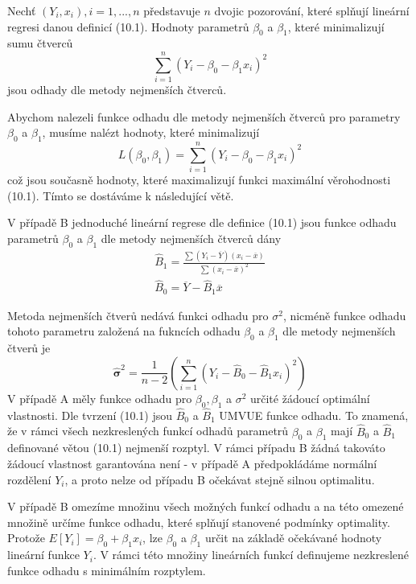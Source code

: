 \begin{definition}
Nechť $(Y_i, x_i), i = 1, ..., n$ představuje $n$ dvojic pozorování, které splňují lineární regresi danou definicí (10.1). Hodnoty parametrů $\beta_0$ a $\beta_1$, které minimalizují sumu čtverců
\begin{equation*}
\sum_{i = 1}^n (Y_i - \beta_0 - \beta_1 x_i)^2
\end{equation*}
jsou odhady dle metody nejmenších čtverců.
\end{definition}

Abychom nalezeli funkce odhadu dle metody nejmenších čtverců pro parametry $\beta_0$ a $\beta_1$, musíme nalézt hodnoty, které minimalizují
\begin{equation*}
L(\beta_0, \beta_1) = \sum_{i = 1}^n (Y_i - \beta_0 - \beta_1 x_i)^2
\end{equation*}
což jsou současně hodnoty, které maximalizují funkci maximální věrohodnosti (10.1). Tímto se dostáváme k následující větě.
\begin{theorem}
V případě B jednoduché lineární regrese dle definice (10.1) jsou funkce odhadu parametrů $\beta_0$ a $\beta_1$ dle metody nejmenších čtverců dány
\begin{gather*}
\hat{B}_1 = \frac{\sum (Y_i - \overline{Y})(x_i - \overline{x})}{\sum (x_i - \overline{x})^2}\\
\hat{B}_0 = \overline{Y} - \hat{B}_1 \overline{x}
\end{gather*}
\end{theorem}

Metoda nejmenších čtverů nedává funkci odhadu pro $\sigma^2$, nicméně funkce odhadu tohoto parametru založená na fukncích odhadu $\beta_0$ a $\beta_1$ dle metody nejmenších čtverů je
\begin{equation*}
\hat{\boldsymbol \sigma}^2 = \frac{1}{n - 2}\left(\sum_{i = 1}^n (Y_i - \hat{B}_0 - \hat{B}_1 x_i)^2\right)
\end{equation*} 
V případě A měly funkce odhadu pro $\beta_0, \beta_1$ a $\sigma^2$ určité žádoucí optimální vlastnosti. Dle tvrzení (10.1) jsou $\hat{B}_0$ a $\hat{B}_1$ UMVUE funkce odhadu. To znamená, že v rámci všech nezkreslených funkcí odhadů parametrů $\beta_0$ a $\beta_1$ mají $\hat{B}_0$ a $\hat{B}_1$ definované větou (10.1) nejmenší rozptyl. V rámci případu B žádná takováto žádoucí vlastnost garantována není - v případě A předpokládáme normální rozdělení $Y_i$, a proto nelze od případu B očekávat stejně silnou optimalitu.

V případě B omezíme množinu všech možných funkcí odhadu a na této omezené množině určíme funkce odhadu, které splňují stanovené podmínky optimality. Protože $E[Y_i] = \beta_0 + \beta_1 x_i$, lze $\beta_0$ a $\beta_1$ určit na základě očekávané hodnoty lineární funkce $Y_i$. V rámci této množiny lineárních funkcí definujeme nezkreslené funkce odhadu s minimálním rozptylem.

